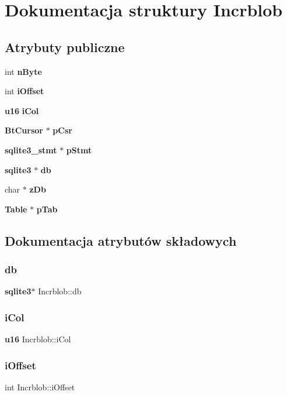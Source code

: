 \section{Dokumentacja struktury Incrblob}
\label{struct_incrblob}
\subsection*{Atrybuty publiczne}
\begin{DoxyCompactItemize}
\item 
int \textbf{ n\+Byte}
\item 
int \textbf{ i\+Offset}
\item 
\textbf{ u16} \textbf{ i\+Col}
\item 
\textbf{ Bt\+Cursor} $\ast$ \textbf{ p\+Csr}
\item 
\textbf{ sqlite3\+\_\+stmt} $\ast$ \textbf{ p\+Stmt}
\item 
\textbf{ sqlite3} $\ast$ \textbf{ db}
\item 
char $\ast$ \textbf{ z\+Db}
\item 
\textbf{ Table} $\ast$ \textbf{ p\+Tab}
\end{DoxyCompactItemize}


\subsection{Dokumentacja atrybutów składowych}
\mbox{\label{struct_incrblob_a9d3fe0b0229b75b9d0f9ee8e6545b5bc}} 
\subsubsection{db}
{\footnotesize\ttfamily \textbf{ sqlite3}$\ast$ Incrblob\+::db}

\mbox{\label{struct_incrblob_a548b6446ea03ea0ab17c99fd7cef5884}} 
\subsubsection{iCol}
{\footnotesize\ttfamily \textbf{ u16} Incrblob\+::i\+Col}

\mbox{\label{struct_incrblob_af8e71744f43178967460b9f402e7fafd}} 
\subsubsection{iOffset}
{\footnotesize\ttfamily int Incrblob\+::i\+Offset}

